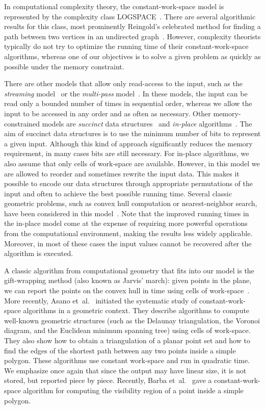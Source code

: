 \documentclass[11pt,a4paper]{article}
\newcommand{\etal}{et~al.}
\begin{document}
In computational complexity theory, the constant-work-space model
is represented by the
complexity class LOGSPACE~\cite{AroraBa09}. There are several algorithmic
results for this class, most prominently Reingold's celebrated method for
finding a path between two vertices in an undirected
graph~\cite{Reingold08}. However, complexity theorists typically do not
try to optimize the running time of their constant-work-space algorithms,
whereas one of our objectives is to solve a given problem as quickly as
possible under the memory constraint.


There are other models that allow only read-access to the input, such as
the \emph{streaming} model~\cite{Muthukrishnan05} or the
\emph{multi-pass} model~\cite{ChanCh07}.
In these models, the input can be read only a bounded number of times
in sequential order, whereas we allow the input to be accessed in any order and
as often as necessary.
Other memory-constrained models are \emph{succinct}
data structures~\cite{JacoSucc89} and \emph{in-place}
algorithms~\cite{BronnimannIaKaMoMoTo04,BronnimannChCh04,ChanCh10,BronnimannCh06}.
The aim of succinct data structures is to use the minimum number of
bits to represent a given input. Although this kind of approach
significantly reduces the memory requirement,
in many cases  bits are still necessary.
For in-place algorithms, we also assume that only  cells of work-space
are available. However, in this model we are  allowed to reorder and sometimes
rewrite the input data. This makes it possible to encode our data
structures through appropriate permutations of the input and often
to achieve the best possible running time. Several classic geometric problems,
such as convex hull computation or nearest-neighbor search, have
been considered in this
model~\cite{BronnimannIaKaMoMoTo04,BronnimannChCh04,ChanCh10,BronnimannCh06}.
Note that the improved running times in the in-place model come at
the expense of requiring more powerful operations from the computational
environment, making the results less widely applicable.
Moreover, in most of
these cases the input values cannot be recovered after the algorithm
is executed.

A classic algorithm from computational geometry that fits into
our model is the gift-wrapping method
(also known as Jarvis' march):
given  points in the plane, we can report the  points
on the convex hull in  time using  cells of
work-space~\cite{s-chc-04}.
More recently, Asano \etal~\cite{AsanoMuRoWa11} initiated
the systematic study of constant-work-space algorithms
in a geometric context.  They
describe algorithms to compute well-known geometric structures (such as the
Delaunay triangulation, the Voronoi diagram, and the Euclidean
minimum spanning tree) using  cells of work-space.
They also show how to obtain a triangulation of a planar point
set and how to find the edges of the shortest path between any two points
inside a simple polygon. These algorithms use constant work-space
and run in quadratic time.
We emphasize once again
that since the output may have linear size, it is not stored,
but reported piece by piece.
Recently, Barba \etal~\cite{BarKorLanSil11}
gave a constant-work-space algorithm
for computing the visibility
region of a point inside a simple polygon.
\end{document}
